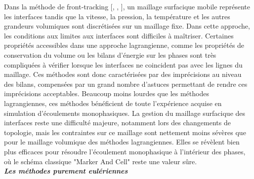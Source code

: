 Dans la m\'ethode de front-tracking [\cite{Unverdi1992}, \cite{Shin2002}, \cite{Duquennoy2000}], un maillage surfacique mobile repr\'esente les interfaces tandis que la vitesse, la pression, la temp\'erature et les autres grandeurs volumiques sont discr\'etis\'ees sur un maillage fixe. Dans cette approche, les conditions aux limites aux interfaces sont difficiles \`a ma\^itriser.
Certaines propri\'et\'es accessibles dans une approche lagrangienne, comme les propri\'et\'es de conservation du volume ou les bilans d’\'energie sur les phases sont tr\`es compliqu\'ees à v\'erifier lorsque les interfaces ne coincident pas avec les lignes du maillage. Ces m\'ethodes sont donc caract\'eris\'ees par des impr\'ecisions au niveau des bilans, compens\'ees par un grand nombre d’astuces permettant de rendre ces impr\'ecisions acceptables. Beaucoup moins lourdes que les m\'ethodes lagrangiennes, ces m\'ethodes b\'en\'eficient de toute l’exp\'erience acquise en simulation d’\'ecoulements monophasiques. La gestion du maillage surfacique des interfaces reste une difficult\'e majeure, notamment lors des changements de topologie, mais les contraintes sur ce maillage sont nettement moins s\'ev\`eres que pour le maillage volumique des m\'ethodes lagrangiennes. Elles se r\'ev\`elent bien plus efficaces pour r\'esoudre l’\'ecoulement monophasique à l’int\'erieur des phases, o\`u le sch\'ema classique "Marker And Cell" reste une valeur s\^ure.\smallskip \\

\textit{\textbf{Les m\'ethodes purement eul\'eriennes}}\smallskip \\

